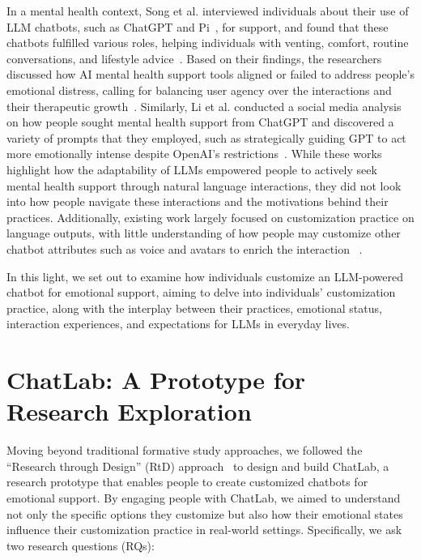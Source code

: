 In a mental health context, Song et al. interviewed individuals about their use of LLM chatbots, such as ChatGPT and Pi~\cite{piai}, for support, and found that these chatbots fulfilled various roles, helping individuals with venting, comfort, routine conversations, and lifestyle advice~\cite{song2024typingcure}.
Based on their findings, the researchers discussed how AI mental health support tools aligned or failed to address people's emotional distress, calling for balancing user agency over the interactions and their therapeutic growth~\cite{song2024typingcure}.
Similarly, Li et al. conducted a social media analysis on how people sought mental health support from ChatGPT and discovered a variety of prompts that they employed, such as strategically guiding GPT to act more emotionally intense despite OpenAI's restrictions~\cite{li4875898human}.
While these works highlight how the adaptability of LLMs empowered people to actively seek mental health support through natural language interactions, they did not look into how people navigate these interactions and the motivations behind their practices. Additionally, existing work largely focused on customization practice on language outputs, with little understanding of how people may customize other chatbot attributes such as voice and avatars to enrich the interaction ~\cite{Feine2019Taxonomy, deSouza2022Design}.

In this light, we set out to examine how individuals customize an LLM-powered chatbot for emotional support, aiming to delve into individuals' customization practice, along with the interplay between their practices, emotional status, interaction experiences, and expectations for LLMs in everyday lives.

\section{ChatLab: A Prototype for Research Exploration}
Moving beyond traditional formative study approaches, we followed the ``Research through Design'' (RtD) approach~\cite{zimmerman2007research, zimmerman2014research} to design and build ChatLab, a research prototype that enables people to create customized chatbots for emotional support. 
By engaging people with ChatLab, we aimed to understand not only the specific options they customize but also how their emotional states influence their customization practice in real-world settings. %
Specifically, we ask two research questions (RQs): 


